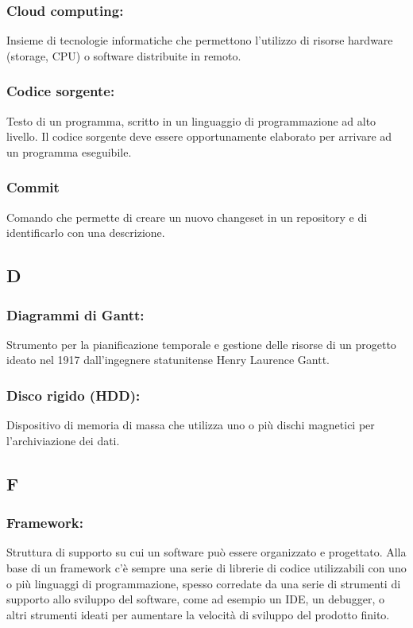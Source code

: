 \subsubsection*{Cloud computing:} Insieme di tecnologie informatiche che
permettono l'utilizzo di risorse hardware (storage, CPU) o software distribuite in remoto.

\subsubsection*{Codice sorgente:} Testo di un programma, scritto in un
linguaggio di programmazione ad alto livello. Il codice sorgente deve essere
opportunamente elaborato per arrivare ad un programma eseguibile.

\subsubsection*{Commit} Comando che permette di creare un nuovo changeset in
un repository e di identificarlo con una descrizione.

\subsection*{\huge{D}}

\subsubsection*{Diagrammi di Gantt:} Strumento per la pianificazione temporale e
gestione delle risorse di un progetto ideato nel 1917 dall'ingegnere
statunitense Henry Laurence Gantt.

\subsubsection*{Disco rigido (HDD):} Dispositivo di memoria di massa che
utilizza uno o pi\`u dischi magnetici per l'archiviazione dei dati.


\subsection*{\huge{F}}
\subsubsection*{Framework:}  Struttura di supporto su cui un software pu\`o
essere organizzato e progettato. Alla base di un framework c'\`e sempre una
serie di librerie di codice utilizzabili con uno o pi\`u linguaggi di
programmazione, spesso corredate da una serie di strumenti di supporto allo
sviluppo del software, come ad esempio un IDE, un debugger, o altri strumenti
ideati per aumentare la velocità di sviluppo del prodotto finito.

